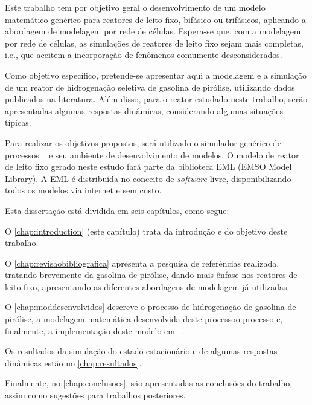 Este trabalho tem por objetivo geral o desenvolvimento de um modelo
matemático genérico para reatores de leito fixo, bifásico ou trifásicos,
aplicando a abordagem de modelagem por rede de células. Espera-se que, com a modelagem por
rede de células, as simulações de reatores de leito fixo sejam mais completas,
i.e., que aceitem a incorporação de fenômenos comumente desconsiderados.

Como objetivo específico, pretende-se apresentar aqui a modelagem e a
simulação de um reator de hidrogenação seletiva de gasolina de pirólise,
utilizando dados publicados na literatura. Além disso, para o reator estudado
neste trabalho, serão apresentadas algumas respostas dinâmicas, considerando
algumas situações típicas.

Para realizar os objetivos propostos, será utilizado o simulador genérico de
processos \emso\ \cite{Soares2003} e seu ambiente de desenvolvimento de
modelos. O modelo de reator de leito fixo gerado neste estudo fará parte da
biblioteca EML (EMSO Model Library). A EML é distribuída no conceito de \emph{software} livre,
disponibilizando todos os modelos via internet e sem custo.

Esta dissertação está dividida em seis capítulos, como segue:

O \autoref{chap:introduction} (este capítulo) trata da introdução e do objetivo deste trabalho.

O \autoref{chap:revisaobibliografica} apresenta a pesquisa de referências
realizada, tratando brevemente da gasolina de pirólise, dando mais ênfase nos
reatores de leito fixo, apresentando as diferentes abordagens de modelagem
já utilizadas.

O \autoref{chap:moddesenvolvidos} descreve o processo de
hidrogenação de gasolina de pirólise, a modelagem matemática
desenvolvida deste processoo processo e, finalmente, a implementação
deste modelo em \emso\ .

Os resultados da simulação do estado estacionário e de algumas
respostas dinâmicas estão no \autoref{chap:resultados}.

Finalmente, no \autoref{chap:conclusoes}, são apresentadas as conclusões do
trabalho, assim como sugestões para trabalhos posteriores.
